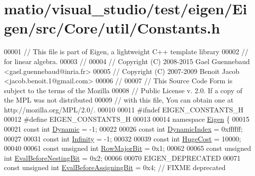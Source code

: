 \hypertarget{matio_2visual__studio_2test_2eigen_2_eigen_2src_2_core_2util_2_constants_8h_source}{}\section{matio/visual\+\_\+studio/test/eigen/\+Eigen/src/\+Core/util/\+Constants.h}
\label{matio_2visual__studio_2test_2eigen_2_eigen_2src_2_core_2util_2_constants_8h_source}

\begin{DoxyCode}
00001 \textcolor{comment}{// This file is part of Eigen, a lightweight C++ template library}
00002 \textcolor{comment}{// for linear algebra.}
00003 \textcolor{comment}{//}
00004 \textcolor{comment}{// Copyright (C) 2008-2015 Gael Guennebaud <gael.guennebaud@inria.fr>}
00005 \textcolor{comment}{// Copyright (C) 2007-2009 Benoit Jacob <jacob.benoit.1@gmail.com>}
00006 \textcolor{comment}{//}
00007 \textcolor{comment}{// This Source Code Form is subject to the terms of the Mozilla}
00008 \textcolor{comment}{// Public License v. 2.0. If a copy of the MPL was not distributed}
00009 \textcolor{comment}{// with this file, You can obtain one at http://mozilla.org/MPL/2.0/.}
00010 
00011 \textcolor{preprocessor}{#ifndef EIGEN\_CONSTANTS\_H}
00012 \textcolor{preprocessor}{#define EIGEN\_CONSTANTS\_H}
00013 
00014 \textcolor{keyword}{namespace }\hyperlink{namespace_eigen}{Eigen} \{
00015 
00021 \textcolor{keyword}{const} \textcolor{keywordtype}{int} \hyperlink{namespace_eigen_ad81fa7195215a0ce30017dfac309f0b2}{Dynamic} = -1;
00022 
00026 \textcolor{keyword}{const} \textcolor{keywordtype}{int} \hyperlink{namespace_eigen_a73c597189a4a99127175e8167c456fff}{DynamicIndex} = 0xffffff;
00027 
00031 \textcolor{keyword}{const} \textcolor{keywordtype}{int} \hyperlink{namespace_eigen_a7951593b031e13d90223c83d022ce99e}{Infinity} = -1;
00032 
00039 \textcolor{keyword}{const} \textcolor{keywordtype}{int} \hyperlink{namespace_eigen_a3163430a1c13173faffde69016b48aaf}{HugeCost} = 10000;
00040 
00061 \textcolor{keyword}{const} \textcolor{keywordtype}{unsigned} \textcolor{keywordtype}{int} \hyperlink{group__flags_gae4f56c2a60bbe4bd2e44c5b19cbe8762}{RowMajorBit} = 0x1;
00062 
00065 \textcolor{keyword}{const} \textcolor{keywordtype}{unsigned} \textcolor{keywordtype}{int} \hyperlink{group__flags_gaa34e83bae46a8eeae4e69ebe3aaecbed}{EvalBeforeNestingBit} = 0x2;
00066 
00070 EIGEN\_DEPRECATED
00071 \textcolor{keyword}{const} \textcolor{keywordtype}{unsigned} \textcolor{keywordtype}{int} \hyperlink{group__flags_ga0972b20dc004d13984e642b3bd12532e}{EvalBeforeAssigningBit} = 0x4; \textcolor{comment}{// FIXME deprecated}

\end{DoxyCode}

